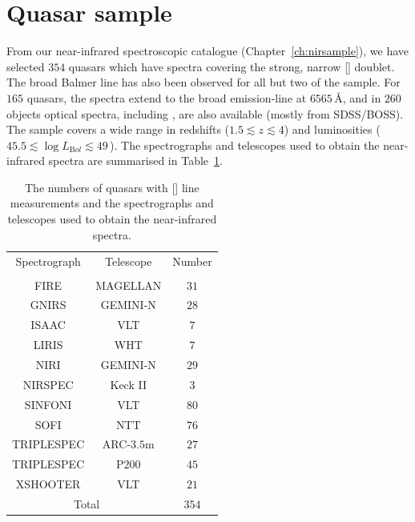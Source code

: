 \section{Quasar sample}

From our near-infrared spectroscopic catalogue (Chapter~\ref{ch:nirsample}), we have selected $354$ quasars which have spectra covering the strong, narrow [] doublet. 
The broad Balmer \hb line has also been observed for all but two of the sample. 
For $165$ quasars, the spectra extend to the broad \ha emission-line at $6565$\,\AA, and in $260$ objects optical spectra, including , are also available (mostly from SDSS/BOSS). 
The sample covers a wide range in redshifts ($1.5 \lesssim z \lesssim 4$) and luminosities ($45.5 \lesssim \log L_{\mathrm Bol} \lesssim 49$\,\ergs). 
The spectrographs and telescopes used to obtain the near-infrared spectra are summarised in Table~\ref{tab:specnums_ch4}.

\begin{table}
  \centering
  \footnotesize 
  \caption{The numbers of quasars with [] line measurements and the spectrographs and telescopes used to obtain the near-infrared spectra.}
  \label{tab:specnums_ch4}
    \begin{tabular}{ccc} 
    \hline
    Spectrograph & Telescope & Number \\
                 &           & \\
    \hline
    FIRE         & MAGELLAN  & $31$ \\
    GNIRS        & GEMINI-N  & $28$ \\
    ISAAC        & VLT       & $7$ \\
    LIRIS        & WHT       & $7$ \\
    NIRI         & GEMINI-N  & $29$ \\
    NIRSPEC      & Keck II   & $3$ \\
    SINFONI      & VLT       & $80$ \\
    SOFI         & NTT       & $76$ \\
    TRIPLESPEC   & ARC-$3.5$m  & $27$ \\
    TRIPLESPEC   & P$200$      & $45$ \\
    XSHOOTER     & VLT       & $21$ \\
    \hline
    \multicolumn{2}{c}{Total} & $354$ \\
    \hline
    \end{tabular}
\end{table} 

